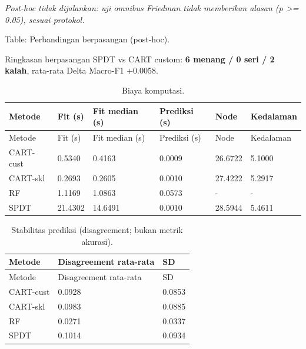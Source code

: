 \documentclass[
  conference]{IEEEtran}
\begin{document}
\emph{Post-hoc tidak dijalankan: uji omnibus Friedman tidak memberikan
alasan (p \textgreater= 0.05), sesuai protokol.}

Table: Perbandingan berpasangan (post-hoc).

Ringkasan berpasangan SPDT vs CART custom: \textbf{6 menang / 0 seri / 2
kalah}, rata-rata Delta Macro-F1 +0.0058.

\begin{longtable}[]{@{}llllll@{}}
\caption{Biaya komputasi.}\tabularnewline
\toprule\noalign{}
Metode & Fit (s) & Fit median (s) & Prediksi (s) & Node & Kedalaman \\
\midrule\noalign{}
\endfirsthead
\toprule\noalign{}
Metode & Fit (s) & Fit median (s) & Prediksi (s) & Node & Kedalaman \\
\midrule\noalign{}
\endhead
\bottomrule\noalign{}
\endlastfoot
CART-cust & 0.5340 & 0.4163 & 0.0009 & 26.6722 & 5.1000 \\
CART-skl & 0.2693 & 0.2605 & 0.0010 & 27.4222 & 5.2917 \\
RF & 1.1169 & 1.0863 & 0.0573 & - & - \\
SPDT & 21.4302 & 14.6491 & 0.0010 & 28.5944 & 5.4611 \\
\end{longtable}

\begin{longtable}[]{@{}lll@{}}
\caption{Stabilitas prediksi (disagreement; bukan metrik
akurasi).}\tabularnewline
\toprule\noalign{}
Metode & Disagreement rata-rata & SD \\
\midrule\noalign{}
\endfirsthead
\toprule\noalign{}
Metode & Disagreement rata-rata & SD \\
\midrule\noalign{}
\endhead
\bottomrule\noalign{}
\endlastfoot
CART-cust & 0.0928 & 0.0853 \\
CART-skl & 0.0983 & 0.0885 \\
RF & 0.0271 & 0.0337 \\
SPDT & 0.1014 & 0.0934 \\
\end{longtable}
\end{document}
